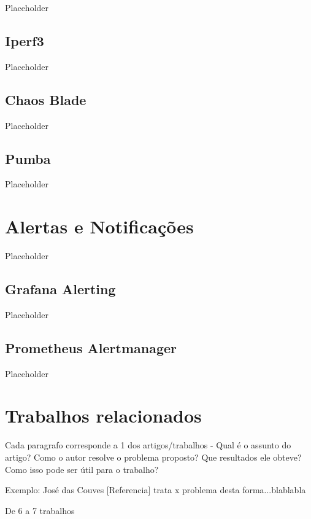 Placeholder

\subsection{Iperf3}
\label{subsection:Iperf3}

Placeholder

\subsection{Chaos Blade}
\label{subsection:ChaosBlade}

Placeholder

\subsection{Pumba}
\label{subsection:Pumba}

Placeholder

\section{Alertas e Notificações}
\label{section:AlertasNotificacoes}

Placeholder

\subsection{Grafana Alerting}
\label{subsection:GrafanaAlerting}

Placeholder

\subsection{Prometheus Alertmanager}
\label{subsection:PrometheusAlertmanager}

Placeholder

\section{Trabalhos relacionados}
\label{section:TrabalhosRelacionados}

Cada paragrafo corresponde a 1 dos artigos/trabalhos - Qual é o assunto do artigo? Como o autor resolve o problema proposto? Que resultados ele obteve? Como isso pode ser útil para o trabalho?

Exemplo: José das Couves [Referencia] trata x problema desta forma...blablabla

De 6 a 7 trabalhos
